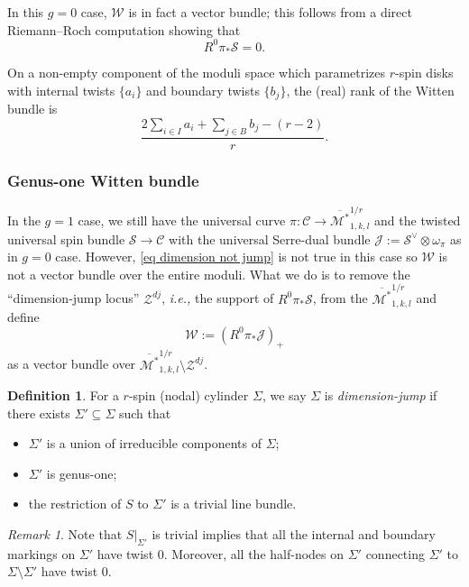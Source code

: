 \documentclass[11pt]{amsart}
\theoremstyle{definition}
\newtheorem{dfn}[dummy]{Definition}
\theoremstyle{remark}
\newtheorem{rmk}[dummy]{Remark}
\newcommand{\<}{\left<}
\renewcommand{\>}{\right>}
\numberwithin{equation}{section}
\def\Mbarstar{{\overline{\mathcal M^*}}}
\begin{document}
In this $g=0$ case, $\mathcal W$ is in fact a %
vector bundle; this %
follows from a direct Riemann--Roch computation showing that 
\begin{equation}\label{eq dimension not jump}
    R^0\pi_*\mathcal{S}=0.
\end{equation}




 On a non-empty component of the moduli space which parametrizes $r$-spin disks with internal twists $\{a_i\}$ and boundary twists $\{b_j\}$, the (real) rank of the Witten bundle is
\begin{equation}\label{eq rank of witten bundle}\frac{2 \sum_{i\in I} a_i + \sum_{j\in B} b_j - (r-2)}{r}.\end{equation}


\subsubsection{Genus-one Witten bundle}
In the $g=1$ case, we still have  the universal curve $\pi: \mathcal{C} \to \Mbarstar_{1,k,l}^{1/r}$ and the twisted universal spin bundle $\mathcal{S} \to \mathcal{C}$   with the universal Serre-dual bundle 
$\mathcal{J}:= \mathcal{S}^{\vee} \otimes \omega_{\pi}$
as in $g=0$ case. However,
\eqref{eq dimension not jump} is not true in this case so $\mathcal W$ is not a vector bundle over the entire moduli. What we do is to remove the ``dimension-jump locus'' $\mathcal Z^{dj}$, \textit{i.e.,} the support of $R^0\pi_*\mathcal S$,  from the %
$\Mbarstar_{1,k,l}^{1/r}$ and %
define 
\begin{equation*}
{\mathcal{W}}:= (R^0\pi_*\mathcal{J})_+
\end{equation*}
as %
a vector bundle over $\Mbarstar_{1,k,l}^{1/r}\setminus \mathcal Z^{dj}$. 

\begin{dfn}
    For a $r$-spin (nodal) cylinder $\Sigma$, we say $\Sigma$ is \textit{dimension-jump} if there exists $\Sigma'\subseteq \Sigma$ such that
    \begin{itemize}
        \item $\Sigma'$ is a union of irreducible components of $\Sigma$;
        \item $\Sigma'$ is genus-one;
        \item the restriction of $S$ to $\Sigma'$ is a trivial line bundle.
    \end{itemize}
\end{dfn}
\begin{rmk}
    Note that $S\vert_{\Sigma'}$ is trivial implies that all the internal and boundary markings on $\Sigma'$ have twist $0$. Moreover, all the half-nodes on $\Sigma'$ connecting $\Sigma'$ to $\Sigma\setminus\Sigma'$ have twist $0$.
\end{rmk}
\end{document}
